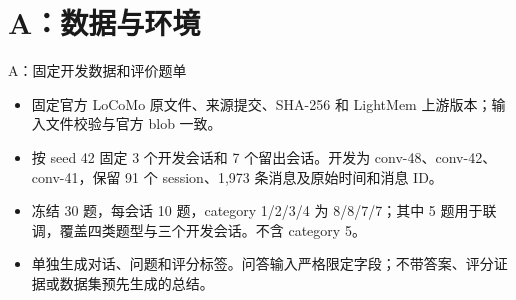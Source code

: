 \section{A：数据与环境}
\begin{frame}{A：固定开发数据和评价题单}
\small
\begin{itemize}
\item 固定官方 LoCoMo 原文件、来源提交、SHA-256 和 LightMem 上游版本；输入文件校验与官方 blob 一致。
\item 按 seed 42 固定 3 个开发会话和 7 个留出会话。开发为 conv-48、conv-42、conv-41，保留 91 个 session、1,973 条消息及原始时间和消息 ID。
\item 冻结 30 题，每会话 10 题，category 1/2/3/4 为 8/8/7/7；其中 5 题用于联调，覆盖四类题型与三个开发会话。不含 category 5。
\item 单独生成对话、问题和评分标签。问答输入严格限定字段；不带答案、评分证据或数据集预先生成的总结。
\end{itemize}
\end{frame}
